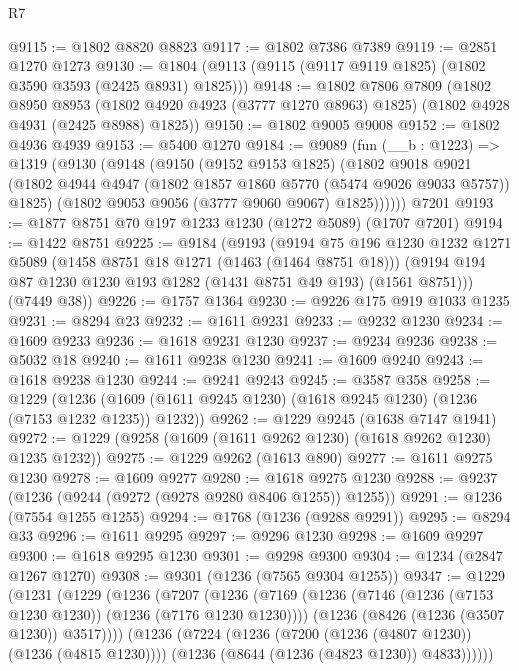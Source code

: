\begin{lexlean}{R7}
\begin{coremodule}
@9115 := @1802 @8820 @8823
@9117 := @1802 @7386 @7389
@9119 := @2851 @1270 @1273
@9130 := @1804 (@9113 (@9115 (@9117 @9119 @1825) (@1802 @3590 @3593 (@2425 @8931) @1825)))
@9148 := @1802
    @7806
    @7809
    (@1802
      @8950
      @8953
      (@1802 @4920 @4923 (@3777 @1270 @8963) @1825)
      (@1802 @4928 @4931 (@2425 @8988) @1825))
@9150 := @1802 @9005 @9008
@9152 := @1802 @4936 @4939
@9153 := @5400 @1270
@9184 := @9089
    (fun (__b : @1223) =>
    @1319
      (@9130
        (@9148
          (@9150
            (@9152 @9153 @1825)
            (@1802
              @9018
              @9021
              (@1802 @4944 @4947 (@1802 @1857 @1860 @5770 (@5474 @9026 @9033 @5757)) @1825)
              (@1802 @9053 @9056 (@3777 @9060 @9067) @1825))))))
    @7201
@9193 := @1877 @8751 @70 @197 @1233 @1230 (@1272 @5089) (@1707 @7201)
@9194 := @1422 @8751
@9225 := @9184
    (@9193
      (@9194
        @75
        @196
        @1230
        @1232
        @1271
        @5089
        (@1458 @8751 @18 @1271 (@1463 (@1464 @8751 @18)))
        (@9194 @194 @87 @1230 @1230 @193 @1282 (@1431 @8751 @49 @193) (@1561 @8751)))
      (@7449 @38))
@9226 := @1757 @1364
@9230 := @9226 @175 @919 @1033 @1235
@9231 := @8294 @23
@9232 := @1611 @9231
@9233 := @9232 @1230
@9234 := @1609 @9233
@9236 := @1618 @9231 @1230
@9237 := @9234 @9236
@9238 := @5032 @18
@9240 := @1611 @9238 @1230
@9241 := @1609 @9240
@9243 := @1618 @9238 @1230
@9244 := @9241 @9243
@9245 := @3587 @358
@9258 := @1229
    (@1236 (@1609 (@1611 @9245 @1230) (@1618 @9245 @1230) (@1236 (@7153 @1232 @1235)) @1232))
@9262 := @1229 @9245 (@1638 @7147 @1941)
@9272 := @1229 (@9258 (@1609 (@1611 @9262 @1230) (@1618 @9262 @1230) @1235 @1232))
@9275 := @1229 @9262 (@1613 @890)
@9277 := @1611 @9275 @1230
@9278 := @1609 @9277
@9280 := @1618 @9275 @1230
@9288 := @9237 (@1236 (@9244 (@9272 (@9278 @9280 @8406 @1255)) @1255))
@9291 := @1236 (@7554 @1255 @1255)
@9294 := @1768 (@1236 (@9288 @9291))
@9295 := @8294 @33
@9296 := @1611 @9295
@9297 := @9296 @1230
@9298 := @1609 @9297
@9300 := @1618 @9295 @1230
@9301 := @9298 @9300
@9304 := @1234 (@2847 @1267 @1270)
@9308 := @9301 (@1236 (@7565 @9304 @1255))
@9347 := @1229
    (@1231
      (@1229
        (@1236
          (@7207
            (@1236
              (@7169
                (@1236 (@7146 (@1236 (@7153 @1230 @1230)) (@1236 (@7176 @1230 @1230))))
                (@1236 (@8426 (@1236 (@3507 @1230)) @3517))))
            (@1236
              (@7224
                (@1236 (@7200 (@1236 (@4807 @1230)) (@1236 (@4815 @1230))))
                (@1236 (@8644 (@1236 (@4823 @1230)) @4833))))))

\end{coremodule}
\end{lexlean}
